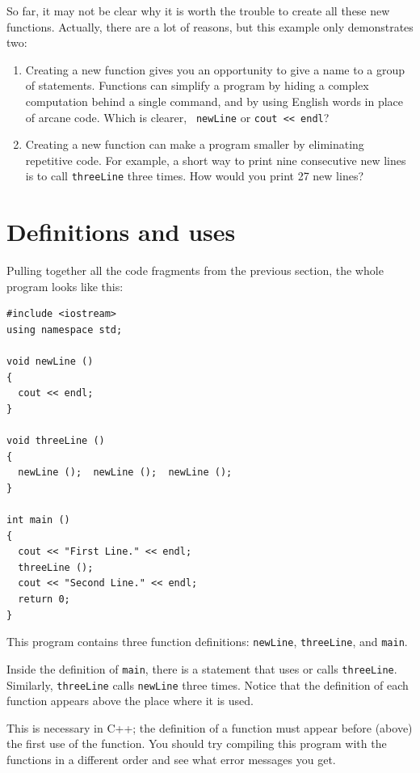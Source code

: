 So far, it may not be clear why it is worth the trouble to
create all these new functions.  Actually, there are a lot
of reasons, but this example only demonstrates two:

\begin{enumerate}

\item Creating a new function gives you an opportunity to
give a name to a group of statements.  Functions can simplify a program
by hiding a complex computation behind a single command, and by using
English words in place of arcane code.  Which is clearer, {\tt
newLine} or {\tt cout << endl}?

\item Creating a new function can make a program smaller by eliminating
repetitive code.  For example, a short way to print nine consecutive
new lines is to call {\tt threeLine} three times.  How would you
print 27 new lines?

\end{enumerate}

\section {Definitions and uses}

Pulling together all the code fragments from the previous
section, the whole program looks like this:

\begin{verbatim}
#include <iostream>
using namespace std;

void newLine ()
{
  cout << endl;
}

void threeLine ()
{
  newLine ();  newLine ();  newLine ();
}

int main ()
{
  cout << "First Line." << endl;
  threeLine ();
  cout << "Second Line." << endl;
  return 0;
}
\end{verbatim}

This program contains three function definitions: {\tt newLine},
{\tt threeLine}, and {\tt main}.

Inside the definition of {\tt main}, there is a statement that
uses or calls {\tt threeLine}.  Similarly, {\tt threeLine} calls
{\tt newLine} three times.  Notice that the definition of each
function appears above the place where it is used.

This is necessary in C++; the definition of a function must
appear before (above) the first use of the function.  You
should try compiling this program with the functions in a
different order and see what error messages you get.

